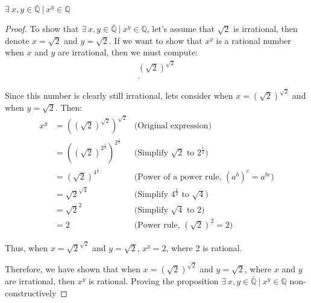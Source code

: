 \documentclass{report}
\begin{document}
    \pagebreak \bigbreak \noindent 
    \begin{prop}
        $\exists\ x,y \in \mathbb{\bar{Q}}\ |\ x^{y} \in \mathbb{Q}$ 
    \end{prop}
    \bigbreak \noindent 
    \begin{proof}
        To show that $\exists\ x,y \in \mathbb{\bar{Q}}\ |\ x^{y} \in \mathbb{Q}$, let's assume that $\sqrt{2}$ is irrational, then denote $x=\sqrt{2}$ and $y=\sqrt{2}$. If we want to show that $x^{y}$ is a rational number when $x$ and $y $ are irrational, then we must compute:
        \begin{align*}
            (\sqrt{2})^{\sqrt{2}}  \\
        .\end{align*}
        \bigbreak \noindent 

        Since this number is clearly still irrational, lets consider when $x=(\sqrt{2})^{\sqrt{2}}$ and when $y=\sqrt{2}$. Then:
        \begin{align*}
            x^{y} &= ((\sqrt{2})^{\sqrt{2}})^{\sqrt{2}} & \text{(Original expression)} \\
            &= ((\sqrt{2})^{2^{\frac{1}{2}}})^{2^{\frac{1}{2}}} & \text{(Simplify } \sqrt{2} \text{ to } 2^{\frac{1}{2}}) \\
            &= (\sqrt{2})^{4^{\frac{1}{2}}} & \text{(Power of a power rule, } (a^{b})^{c} = a^{bc}) \\
            &= \sqrt{2}^{\sqrt{4}} & \text{(Simplify } 4^{\frac{1}{2}} \text{ to } \sqrt{4}) \\
            &= \sqrt{2}^{2} & \text{(Simplify } \sqrt{4} \text{ to } 2) \\
            &= 2 & \text{(Power rule, } (\sqrt{2})^{2} = 2)
        \end{align*}
        \bigbreak \noindent 

        \bigbreak \noindent 

        Thus, when $x = \sqrt{2}^{\sqrt{2}}$ and $y=\sqrt{2}$, $x^{y}=2$, where 2 is rational. 
        \bigbreak \noindent 

        Therefore, we have shown that when $x=(\sqrt{2})^{\sqrt{2}}$ and $y=\sqrt{2}$, where $x$ and $y$ are irrational, then $x^{y}$ is rational. Proving the proposition $\exists\ x,y \in \mathbb{\bar{Q}}\ |\ x^{y} \in \mathbb{Q}$ non-constructively
        \bigbreak \noindent 
        \ep


    \end{proof}
    
    \pagebreak \bigbreak \noindent 
\end{document}
